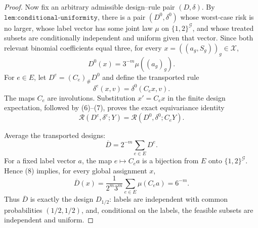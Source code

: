 \documentclass{article}
\begin{document}
\begin{proof}
Now fix an arbitrary admissible design--rule pair \((D,\delta)\).  By
\(\texttt{lem:conditional-uniformity}\), there is a pair
\((D^0,\delta^0)\) whose worst-case risk is no larger, whose label vector
has some joint law \(\mu\) on \(\{1,2\}^{\mathcal G}\), and whose treated
subsets are conditionally independent and uniform given that vector.
Since both relevant binomial coefficients equal three, for every
\(x=((a_g,S_g))_g\in\mathcal X\),
\[
 D^0(x)=3^{-m}\mu((a_g)_g).                                         \tag{8}
\]
For \(e\in E\), let \(D^e=(C_e)_\#D^0\) and define the transported rule
\[
 \delta^e(x,v)=\delta^0(C_ex,v).                                    \tag{9}
\]
The maps \(C_e\) are involutions.  Substitution \(x'=C_ex\) in the finite
design expectation, followed by (6)--(7), proves the exact equivariance
identity
\[
 \mathcal R(D^e,\delta^e;Y)
   =\mathcal R(D^0,\delta^0;C_eY).                                  \tag{10}
\]

Average the transported designs:
\[
 \overline D=2^{-m}\sum_{e\in E}D^e.                               \tag{11}
\]
For a fixed label vector \(a\), the map \(e\mapsto C_ea\) is a bijection
from \(E\) onto \(\{1,2\}^{\mathcal G}\).  Hence (8) implies, for every
global assignment \(x\),
\[
 \overline D(x)
 =\frac{1}{2^m3^m}\sum_{e\in E}\mu(C_ea)
 =6^{-m}.                                                           \tag{12}
\]
Thus \(\overline D\) is exactly the design \(D_{1/2}\): labels are
independent with common probabilities \((1/2,1/2)\), and, conditional on
the labels, the feasible subsets are independent and uniform.


\end{proof}
\end{document}

